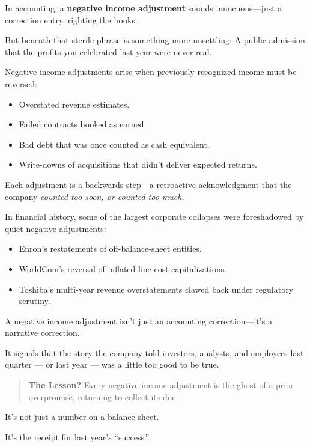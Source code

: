 \begin{tcolorbox}[
  colback=blue!5!white,
  colframe=blue!50!black,
  breakable,
  title={Historical Sidebar: The Ghost of Profits Past --- Negative Income Adjustment}
]

In accounting, a \textbf{negative income adjustment} sounds innocuous—just a correction entry, righting the books.

\medskip

But beneath that sterile phrase is something more unsettling:  
A public admission that the profits you celebrated last year were never real.

\medskip

Negative income adjustments arise when previously recognized income must be reversed:
\begin{itemize}
    \item Overstated revenue estimates.
    \item Failed contracts booked as earned.
    \item Bad debt that was once counted as cash equivalent.
    \item Write-downs of acquisitions that didn’t deliver expected returns.
\end{itemize}

Each adjustment is a backwards step—a retroactive acknowledgment that the company \textit{counted too soon, or counted too much}.

\medskip

In financial history, some of the largest corporate collapses were foreshadowed by quiet negative adjustments:

\medskip

\begin{itemize}
    \item Enron’s restatements of off-balance-sheet entities.
    \item WorldCom’s reversal of inflated line cost capitalizations.
    \item Toshiba’s multi-year revenue overstatements clawed back under regulatory scrutiny.
\end{itemize}

\medskip

A negative income adjustment isn’t just an accounting correction—it’s a narrative correction.

\medskip

It signals that the story the company told investors, analysts, and employees last quarter --- or last year --- was a little too good to be true.

\medskip

\begin{quote}
\textbf{The Lesson?} Every negative income adjustment is the ghost of a prior overpromise, returning to collect its due.
\end{quote}

It’s not just a number on a balance sheet.  

\medskip

It’s the receipt for last year’s “success.”

\end{tcolorbox}

